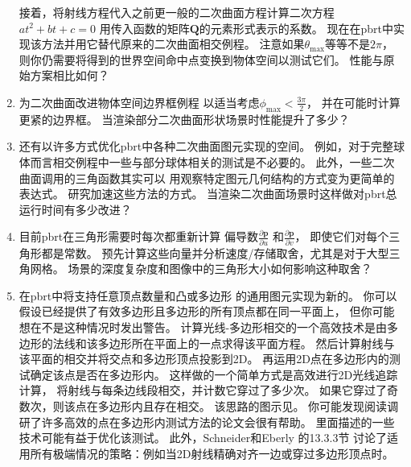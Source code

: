 \begin{enumerate}
          接着，将射线方程代入之前更一般的二次曲面方程计算二次方程$at^2+bt+c=0$
          用传入函数的矩阵$\bm Q$的元素形式表示的系数。
          现在在pbrt中实现该方法并用它替代原来的二次曲面相交例程。
          注意如果$\theta_{\max}$等等不是$2\pi$，
          则你仍需要将得到的世界空间命中点变换到物体空间以测试它们。
          性能与原始方案相比如何？
    \item \circleone 为二次曲面改进物体空间边界框例程
          以适当考虑$\displaystyle\phi_{\max}<\frac{3\pi}{2}$，
          并在可能时计算更紧的边界框。
          当渲染部分二次曲面形状场景时性能提升了多少？
    \item \circletwo 还有以许多方式优化pbrt中各种二次曲面图元实现的空间。
          例如，对于完整球体而言相交例程中一些与部分球体相关的测试是不必要的。
          此外，一些二次曲面调用的三角函数其实可以
          用观察特定图元几何结构的方式变为更简单的表达式。
          研究加速这些方法的方式。
          当渲染二次曲面场景时这样做对pbrt总运行时间有多少改进？
    \item \circleone 目前pbrt在三角形需要时每次都重新计算
          偏导数$\displaystyle\frac{\partial \bm p}{\partial u}$
          和$\displaystyle\frac{\partial \bm p}{\partial v}$，
          即使它们对每个三角形都是常数。
          预先计算这些向量并分析速度/存储取舍，尤其是对于大型三角网格。
          场景的深度复杂度和图像中的三角形大小如何影响这种取舍？
    \item \circletwo 在pbrt中将支持任意顶点数量和凸或多边形
          的通用图元实现为新的。
          你可以假设已经提供了有效多边形且多边形的所有顶点都在同一平面上，
          但你可能想在不是这种情况时发出警告。
          计算光线-多边形相交的一个高效技术是由多边形的法线和该多边形所在平面上的一点求得该平面方程。
          然后计算射线与该平面的相交并将交点和多边形顶点投影到2D。
          再运用2D点在多边形内的测试确定该点是否在多边形内。
          这样做的一个简单方式是高效进行2D光线追踪计算，
          将射线与每条边线段相交，并计数它穿过了多少次。
          如果它穿过了奇数次，则该点在多边形内且存在相交。
          该思路的图示见。
          你可能发现阅读\citet{HAINES199424}调研了许多高效的点在多边形内测试方法的论文会很有帮助。
          里面描述的一些技术可能有益于优化该测试。
          此外，Schneider和Eberly \parencite*{10.5555/2821579}的13.3.3节
          讨论了适用所有极端情况的策略：例如当2D射线精确对齐一边或穿过多边形顶点时。
          \begin{figure}[htbp]
              \centering

\end{figure}
\end{enumerate}
